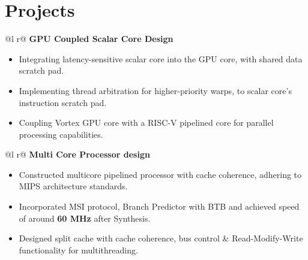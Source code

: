 \documentclass[a4paper,10pt]{article}
\begin{document}
\section{Projects}
\begin{tabularx}{\linewidth}{ @{}l r@{} }
\textbf{GPU Coupled Scalar Core Design} \\[2.75pt]
{
\begin{minipage}[t]{\linewidth}
    \begin{itemize}[nosep,after=\strut, leftmargin=2em, itemsep=3pt]
    \item Integrating latency-sensitive scalar core into the GPU core, with shared data scratch pad. 
    \item Implementing thread arbitration for higher-priority warps, to scalar core's instruction scratch pad.
    \item Coupling Vortex GPU core with a RISC-V pipelined core for parallel processing capabilities. 

    \end{itemize}
\end{minipage}
} 
\end{tabularx}
\begin{tabularx}{\linewidth}{ @{}l r@{} }
\textbf{Multi Core Processor design} \\[2.75pt]
{
\begin{minipage}[t]{\linewidth}
    \begin{itemize}[nosep,after=\strut, leftmargin=2em, itemsep=3pt]
    \item Constructed multicore pipelined processor with cache coherence, adhering to MIPS architecture standards.
    
    \item Incorporated MSI protocol, Branch Predictor with BTB and achieved speed of around \textbf{60 MHz} after Synthesis.

    \item Designed split cache with cache coherence, bus control \& Read-Modify-Write functionality for multithreading.
    
    
    \end{itemize}
\end{minipage}
}  \vspace{-0.1cm}
\end{tabularx}
\end{document}

